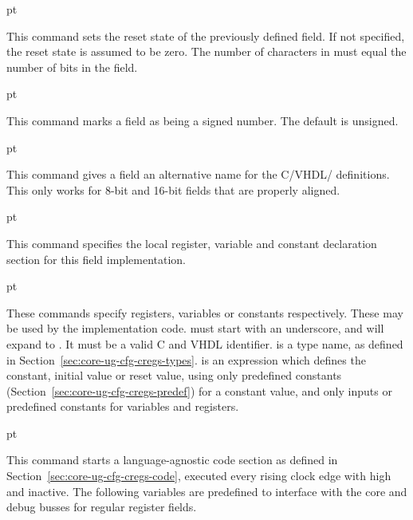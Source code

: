  pt

\noindent This command sets the reset state of the previously defined field. If 
not specified, the reset state is assumed to be zero. The number of characters 
in  must equal the number of bits in the field.

 pt
\codehead{\signed{}}

\noindent This command marks a field as being a signed number. The default is 
unsigned.

 pt

\noindent This command gives a field an alternative name for the 
C/VHDL/ definitions. This only works for 8-bit and 16-bit fields that 
are properly aligned.

 pt
\codehead{\declaration{}}

\noindent This command specifies the local register, variable and constant 
declaration section for this field implementation.

 pt



\noindent These commands specify registers, variables or constants respectively. 
These may be used by the implementation code.  must start with an 
underscore, and will expand to 
. It must be a valid C and 
VHDL identifier.  is a type name, as defined in 
Section~\ref{sec:core-ug-cfg-cregs-types}.  is an expression which 
defines the constant, initial value or reset value, using only predefined 
constants (Section~\ref{sec:core-ug-cfg-cregs-predef}) for a constant value, and 
only inputs or predefined constants for variables and registers.

 pt
\codehead{\implementation{}}

\noindent This command starts a language-agnostic code section as defined in 
Section~\ref{sec:core-ug-cfg-cregs-code}, executed every rising clock edge with 
 high and  inactive. The following variables are 
predefined to interface with the core and debug busses for regular register
fields.

